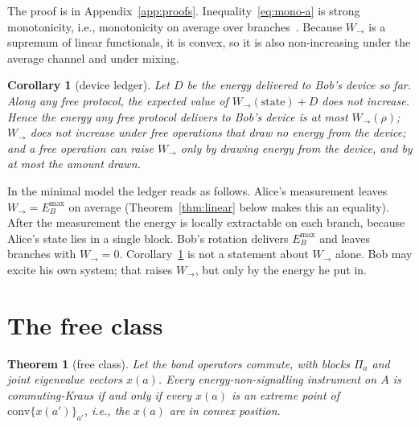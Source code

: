 \documentclass[aps,pra,twocolumn,reprint,superscriptaddress,nofootinbib,floatfix]{revtex4-2}
\theoremstyle{plain}
\newtheorem{theorem}{Theorem}
\newtheorem{corollary}{Corollary}
\theoremstyle{remark}
\newcommand{\Wto}{W_{\to}}
\begin{document}
The proof is in Appendix~\ref{app:proofs}. Inequality~\eqref{eq:mono-a} is strong
monotonicity, i.e., monotonicity on average over branches~\cite{ChitambarGour2019}. Because
$\Wto$ is a supremum of linear functionals, it is convex, so it is also non-increasing under
the average channel and under mixing.

\begin{corollary}[device ledger]
\label{cor:ledger}
Let $D$ be the energy delivered to Bob's device so far. Along any free protocol, the
expected value of $\Wto(\text{state})+D$ does not increase. Hence the energy any free
protocol delivers to Bob's device is at most $\Wto(\rho)$; $\Wto$ does not increase under
free operations that draw no energy from the device; and a free operation can raise $\Wto$
only by drawing energy from the device, and by at most the amount drawn.
\end{corollary}

In the minimal model the ledger reads as follows. Alice's measurement leaves
$\Wto=E_B^{\max}$ on average (Theorem~\ref{thm:linear} below makes this an equality). After
the measurement the energy is locally extractable on each branch, because Alice's state
lies in a single block. Bob's rotation delivers $E_B^{\max}$ and leaves branches with
$\Wto=0$. Corollary~\ref{cor:ledger} is not a statement about $\Wto$ alone. Bob may excite
his own system; that raises $\Wto$, but only by the energy he put in.

\section{The free class}
\label{sec:freeclass}

\begin{theorem}[free class]
\label{thm:freeclass}
Let the bond operators commute, with blocks $\Pi_a$ and joint eigenvalue vectors $x(a)$.
Every energy-non-signalling instrument on $A$ is commuting-Kraus if and only if every $x(a)$
is an extreme point of $\mathrm{conv}\{x(a')\}_{a'}$, i.e., the $x(a)$ are in convex
position.
\end{theorem}
\end{document}
